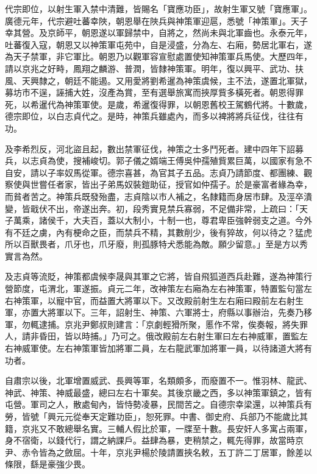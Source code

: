 \begin{pinyinscope}
 代宗即位，以射生軍入禁中清難，皆賜名「寶應功臣」，故射生軍又號「寶應軍」。廣德元年，代宗避吐蕃幸陜，朝恩舉在陜兵與神策軍迎扈，悉號「神策軍」。天子幸其營。及京師平，朝恩遂以軍歸禁中，自將之，然尚未與北軍齒也。永泰元年，吐蕃復入寇，朝恩又以神策軍屯苑中，自是浸盛，分為左、右廂，勢居北軍右，遂為天子禁軍，非它軍比。朝恩乃以觀軍容宣慰處置使知神策軍兵馬使。大歷四年，請以京兆之好畤，鳳翔之麟游、普潤，皆隸神策軍。明年，復以興平、武功、扶風、天興隸之，朝廷不能遏。又用愛將劉希暹為神策虞候，主不法，遂置北軍獄，募坊市不逞，誣捕大姓，沒產為賞，至有選舉旅寓而挾厚貲多橫死者。朝恩得罪死，以希暹代為神策軍使。是歲，希暹復得罪，以朝恩舊校王駕鶴代將。十數歲，德宗即位，以白志貞代之。是時，神策兵雖處內，而多以裨將將兵征伐，往往有功。



 及李希烈反，河北盜且起，數出禁軍征伐，神策之士多鬥死者。建中四年下詔募兵，以志貞為使，搜補峻切。郭子儀之婿端王傅吳仲孺殖貲累巨萬，以國家有急不自安，請以子率奴馬從軍。德宗喜甚，為官其子五品。志貞乃請節度、都團練、觀察使與世嘗任者家，皆出子弟馬奴裝鎧助征，授官如仲孺子。於是豪富者緣為幸，而貧者苦之。神策兵既發殆盡，志貞陰以市人補之，名隸籍而身居市肆。及涇卒潰變，皆戢伏不出，帝遂出奔。初，段秀實見禁兵寡弱，不足備非常，上疏曰：「天子萬乘，諸侯千，大夫百，蓋以大制小，十制一也，尊君卑臣強幹弱支之道。今外有不廷之虜，內有梗命之臣，而禁兵不精，其數削少，後有猝故，何以待之？猛虎所以百獸畏者，爪牙也，爪牙廢，則孤豚特犬悉能為敵。願少留意。」至是方以秀實言為然。



 及志貞等流貶，神策都虞候李晟與其軍之它將，皆自飛狐道西兵赴難，遂為神策行營節度，屯渭北，軍遂振。貞元二年，改神策左右廂為左右神策軍，特置監句當左右神策軍，以寵中官，而益置大將軍以下。又改殿前射生左右廂曰殿前左右射生軍，亦置大將軍以下。三年，詔射生、神策、六軍將士，府縣以事辦治，先奏乃移軍，勿輒逮捕。京兆尹鄭叔則建言：「京劇輕猾所聚，慝作不常，俟奏報，將失罪人，請非昏田，皆以時捕。」乃可之。俄改殿前左右射生軍曰左右神威軍，置監左右神威軍使。左右神策軍皆加將軍二員，左右龍武軍加將軍一員，以待諸道大將有功者。



 自肅宗以後，北軍增置威武、長興等軍，名類頗多，而廢置不一。惟羽林、龍武、神武、神策、神威最盛，總曰左右十軍矣。其後京畿之西，多以神策軍鎮之，皆有屯營。軍司之人，散處甸內，皆恃勢凌暴，民間苦之。自德宗幸梁還，以神策兵有勞，皆號「興元元從奉天定難功臣」，恕死罪。中書、御史府、兵部乃不能歲比其籍，京兆又不敢總舉名實。三輔人假比於軍，一牒至十數。長安奸人多寓占兩軍，身不宿衛，以錢代行，謂之納課戶。益肆為暴，吏稍禁之，輒先得罪，故當時京尹、赤令皆為之斂屈。十年，京兆尹楊於陵請置挾名敕，五丁許二丁居軍，餘差以條限，繇是豪強少畏。




\end{pinyinscope}
